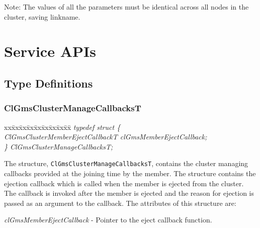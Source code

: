 \begin{flushleft}
\begin{Desc}
\item[Note:]The values of all the parameters must be identical across all nodes in the cluster, saving
linkname. \end{Desc}









\chapter{Service APIs}

\section{Type Definitions}
\subsection{ClGmsClusterManageCallbacksT}
\begin{tabbing}
xx\=xx\=xx\=xx\=xx\=xx\=xx\=xx\=xx\=\kill
\textit{typedef struct \{}\\
\>\>\>\>\textit{ClGmsClusterMemberEjectCallbackT clGmsMemberEjectCallback;}\\
\textit{\} ClGmsClusterManageCallbacksT;}\end{tabbing}

The structure, {\tt{ClGmsClusterManageCallbacksT}}, contains the cluster managing callbacks
provided at the joining time by the member. The structure contains the ejection callback which is
called when the member is ejected from the cluster. The callback is invoked after the member is
ejected and the reason for ejection is passed as an argument to the callback. The attributes of this structure are:
\par
 \textit{clGmsMemberEjectCallback} - Pointer to the eject callback function.




\end{flushleft}
